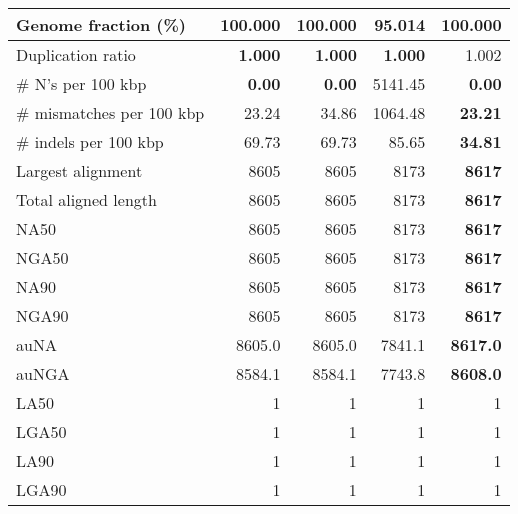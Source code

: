 \documentclass[12pt,a4paper]{article}
\begin{document}
\begin{table}[ht]
\begin{center}
\begin{tabular}{|l*{4}{|r}|}
Genome fraction (\%) & {\bf 100.000} & {\bf 100.000} & 95.014 & {\bf 100.000} \\ \hline
Duplication ratio & {\bf 1.000} & {\bf 1.000} & {\bf 1.000} & 1.002 \\ \hline
\# N's per 100 kbp & {\bf 0.00} & {\bf 0.00} & 5141.45 & {\bf 0.00} \\ \hline
\# mismatches per 100 kbp & 23.24 & 34.86 & 1064.48 & {\bf 23.21} \\ \hline
\# indels per 100 kbp & 69.73 & 69.73 & 85.65 & {\bf 34.81} \\ \hline
Largest alignment & 8605 & 8605 & 8173 & {\bf 8617} \\ \hline
Total aligned length & 8605 & 8605 & 8173 & {\bf 8617} \\ \hline
NA50 & 8605 & 8605 & 8173 & {\bf 8617} \\ \hline
NGA50 & 8605 & 8605 & 8173 & {\bf 8617} \\ \hline
NA90 & 8605 & 8605 & 8173 & {\bf 8617} \\ \hline
NGA90 & 8605 & 8605 & 8173 & {\bf 8617} \\ \hline
auNA & 8605.0 & 8605.0 & 7841.1 & {\bf 8617.0} \\ \hline
auNGA & 8584.1 & 8584.1 & 7743.8 & {\bf 8608.0} \\ \hline
LA50 & 1 & 1 & 1 & 1 \\ \hline
LGA50 & 1 & 1 & 1 & 1 \\ \hline
LA90 & 1 & 1 & 1 & 1 \\ \hline
LGA90 & 1 & 1 & 1 & 1 \\ \hline
\end{tabular}
\end{center}
\end{table}
\end{document}
